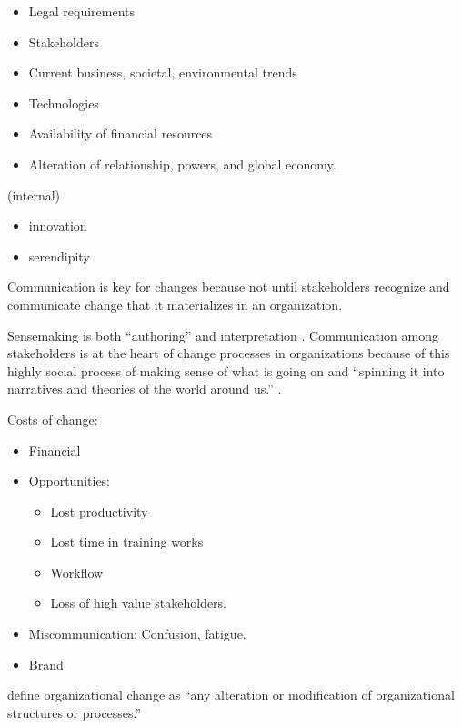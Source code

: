 \documentclass[
]{book}
\providecommand{\tightlist}{%
  \setlength{\itemsep}{0pt}\setlength{\parskip}{0pt}}
\begin{document}
\begin{itemize}
\tightlist
\item
  Legal requirements
\item
  Stakeholders
\item
  Current business, societal, environmental trends
\item
  Technologies
\item
  Availability of financial resources
\item
  Alteration of relationship, powers, and global economy.
\end{itemize}

(internal)

\begin{itemize}
\tightlist
\item
  innovation
\item
  serendipity
\end{itemize}

Communication is key for changes because not until stakeholders recognize and communicate change that it materializes in
an organization.

Sensemaking is both ``authoring'' and interpretation \citep{Lewis_2019}. Communication among stakeholders is at the heart of
change processes in organizations because of this highly social process of making sense of what is going on and
``spinning it into narratives and theories of the world around us.'' \citep{Lewis_2019}.

Costs of change:

\begin{itemize}
\item
  Financial
\item
  Opportunities:

  \begin{itemize}
  \tightlist
  \item
    Lost productivity
  \item
    Lost time in training works
  \item
    Workflow
  \item
    Loss of high value stakeholders.
  \end{itemize}
\item
  Miscommunication: Confusion, fatigue.
\item
  Brand
\end{itemize}

\citep[p.10]{Zorn_1999} define organizational change as ``any alteration or modification of organizational structures or
processes.''
\end{document}
